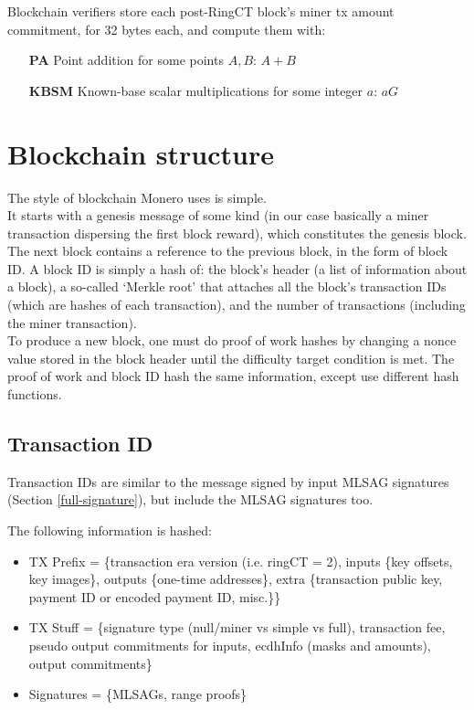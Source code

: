 Blockchain verifiers store each post-RingCT block's miner tx amount commitment, for 32 bytes each, and compute them with:

\begin{itemize}
    \setlength\itemsep{\listspace}
    \item [\textbf{PA}] Point addition for some points $A, B$: $A + B$ \quad [1]
    \item [\textbf{KBSM}] Known-base scalar multiplications for some integer $a$: $a G$ \quad [2]
\end{itemize}


\section{Blockchain structure}
\label{sec:blockchain-structure}

The style of blockchain Monero uses is simple. \\

It starts with a genesis message of some kind (in our case basically a miner transaction dispersing the first block reward), which constitutes the genesis block. The next block contains a reference to the previous block, in the form of block ID. A block ID is simply a hash of: the block's header (a list of information about a block), a so-called `Merkle root' that attaches all the block's transaction IDs (which are hashes of each transaction), and the number of transactions (including the miner transaction). \\

To produce a new block, one must do proof of work hashes by changing a nonce value stored in the block header until the difficulty target condition is met. The proof of work and block ID hash the same information, except use different hash functions.


\subsection{Transaction ID}
\label{subsec:transaction-id} %
Transaction IDs are similar to the message signed by input MLSAG signatures (Section \ref{full-signature}), but include the MLSAG signatures too.

The following information is hashed:
\begin{itemize}
    \item TX Prefix  = \{transaction era version (i.e. ringCT = 2), inputs \{key offsets, key images\}, outputs \{one-time addresses\}, extra \{transaction public key, payment ID or encoded payment ID, misc.\}\}
    \item TX Stuff   = \{signature type (null/miner vs simple vs full), transaction fee, pseudo output commitments for inputs, ecdhInfo (masks and amounts), output commitments\}
    \item Signatures = \{MLSAGs, range proofs\}
\end{itemize}

